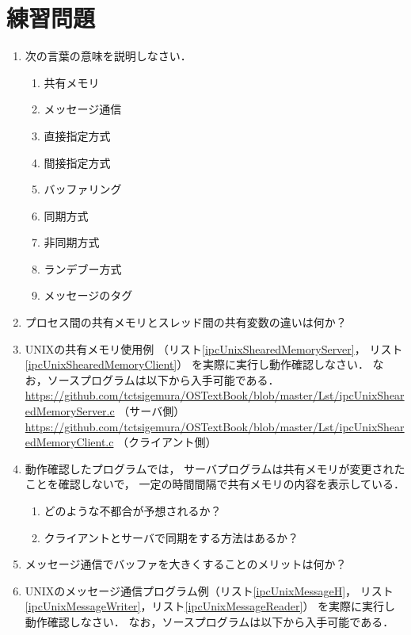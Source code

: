 \section*{練習問題}
\begin{enumerate}
  \renewcommand{\labelenumi}{\ttfamily\arabic{chapter}.\arabic{enumi}}
  \setlength{\leftskip}{1em}
\item 次の言葉の意味を説明しなさい．
  \begin{enumerate}
  \item 共有メモリ
  \item メッセージ通信
  \item 直接指定方式
  \item 間接指定方式
  \item バッファリング
  \item 同期方式
  \item 非同期方式
  \item ランデブー方式
  \item メッセージのタグ
  \end{enumerate}
\item プロセス間の共有メモリとスレッド間の共有変数の違いは何か？
\item UNIXの共有メモリ使用例
  （リスト\ref{ipcUnixShearedMemoryServer}，
    リスト\ref{ipcUnixShearedMemoryClient}）
  を実際に実行し動作確認しなさい．
  なお，ソースプログラムは以下から入手可能である． \\
  \url{https://github.com/tctsigemura/OSTextBook/blob/master/Lst/ipcUnixShearedMemoryServer.c} （サーバ側）\\
  \url{https://github.com/tctsigemura/OSTextBook/blob/master/Lst/ipcUnixShearedMemoryClient.c} （クライアント側）
\item 動作確認したプログラムでは，
  サーバプログラムは共有メモリが変更されたことを確認しないで，
  一定の時間間隔で共有メモリの内容を表示している．
  \begin{enumerate}
  \item どのような不都合が予想されるか？
  \item クライアントとサーバで同期をする方法はあるか？
  \end{enumerate}
\item メッセージ通信でバッファを大きくすることのメリットは何か？
\item UNIXのメッセージ通信プログラム例（リスト\ref{ipcUnixMessageH}，
  リスト\ref{ipcUnixMessageWriter}，リスト\ref{ipcUnixMessageReader}）
  を実際に実行し動作確認しなさい．
  なお，ソースプログラムは以下から入手可能である． \\

\end{enumerate}
